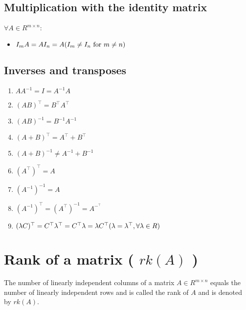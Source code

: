 \subsection{Multiplication with the identity matrix}
$\forall A \in  R^{m\times n}$:

\begin{itemize}
    \item $I_mA = AI_n = A \hfill (I_m \neq I_n \text{ for } m \neq n)$
\end{itemize}


\subsection{Inverses and transposes}
\begin{enumerate}
    \item $AA^{-1} = I = A^{-1}A$

    \item $(AB)^\top  = B^\top A^\top $

    \item $(AB)^{-1} = B^{-1}A^{-1}$

    \item $(A + B)^\top  = A^\top  + B^\top $

    \item $(A + B)^{-1} \neq A^{-1} + B^{-1}$

    \item $(A^\top )^\top  = A$

    \item $(A^{-1})^{-1} = A$

    \item $(A^{-1})^\top  = (A^\top )^{-1} = A^{-^\top} $

    \item $(\lambda C)^\top  = C^\top \lambda ^\top  = C^\top \lambda  = \lambda C^\top  \hfill (\lambda  = \lambda ^\top , \forall\lambda  \in R)$
\end{enumerate}


\section{Rank of a matrix ( $rk(A)$ )}\label{Rank of a matrix}
The number of linearly independent columns of a matrix $A \in  R^{m\times n}$ equals the number of linearly independent rows and is called the rank of $A$ and is denoted by $rk(A)$.

